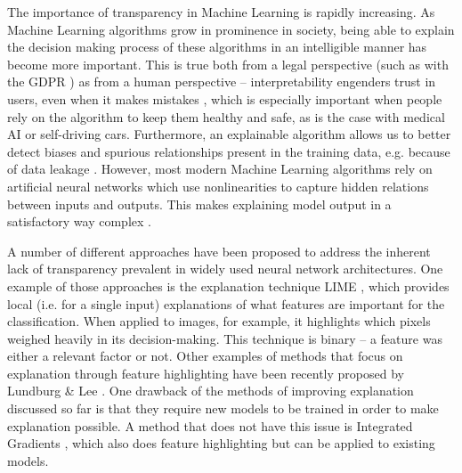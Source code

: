 The importance of transparency in Machine Learning is rapidly increasing. As Machine Learning algorithms grow in prominence in society, being able to explain the decision making process of these algorithms in an intelligible manner has become more important. This is true both from a legal perspective (such as with the GDPR \citep{gdprart}) as from a human perspective -- interpretability engenders trust in users, even when it makes mistakes \citep{automtrust}, which is especially important when people rely on the algorithm to keep them healthy and safe, as is the case with medical AI or self-driving cars. Furthermore, an explainable algorithm allows us to better detect biases and spurious relationships present in the training data, e.g. because of data leakage \citep{dataleakage}. However, most modern Machine Learning algorithms rely on artificial neural networks which use nonlinearities to capture hidden relations between inputs and outputs. This makes explaining model output in a satisfactory way complex \cite{NNblackboxexplanation}.

A number of different approaches have been proposed to address the inherent lack of transparency prevalent in widely used neural network architectures. One example of those approaches is the explanation technique LIME \citep{LIME}, which provides local (i.e. for a single input) explanations of what features are important for the classification. When applied to images, for example, it highlights which pixels weighed heavily in its decision-making. This technique is binary -- a feature was either a relevant factor or not. Other examples of methods that focus on explanation through feature highlighting have been recently proposed by Lundburg \& Lee \citep{featureexamplepaper1}. One drawback of the methods of improving explanation discussed so far is that they require new models to be trained in order to make explanation possible. A method that does not have this issue is Integrated Gradients \citep{axioms}, which also does feature highlighting but can be applied to existing models.

